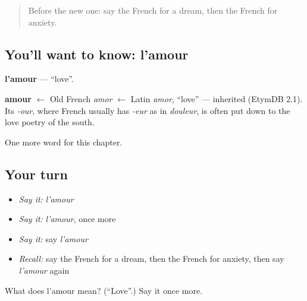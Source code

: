 \begin{quote}
Before the new one: say the French for a dream, then the French for anxiety.
\end{quote}

\subsection*{You'll want to know: l'amour}
\textbf{l'amour} — \textquotedblleft{}love\textquotedblright{}.

\begin{cousinweb}
\textbf{amour} $\leftarrow$ Old French \emph{amor} $\leftarrow$ Latin \emph{amor}, \textquotedblleft{}love\textquotedblright{} — inherited (EtymDB 2.1). Its \emph{-our}, where French usually has \emph{-eur} as in \emph{douleur}, is often put down to the love poetry of the south.
\end{cousinweb}

\begin{grammarlens}[title={What you've built}]
One more word for this chapter.
\end{grammarlens}

\subsection*{Your turn}
\begin{itemize}
\raggedright
  \item \emph{Say it:} \emph{l'amour}
  \item \emph{Say it:} \emph{l'amour}, once more
  \item \emph{Say it:} say \emph{l'amour}
  \item \emph{Recall:} say the French for a dream, then the French for anxiety, then say \emph{l'amour} again
\end{itemize}

\begin{tcolorbox}[breakable,colback=teal!4,colframe=teal!35!black,title={Before you move on}]
What does l'amour mean? (\textquotedblleft{}Love\textquotedblright{}.) Say it once more.
\end{tcolorbox}
